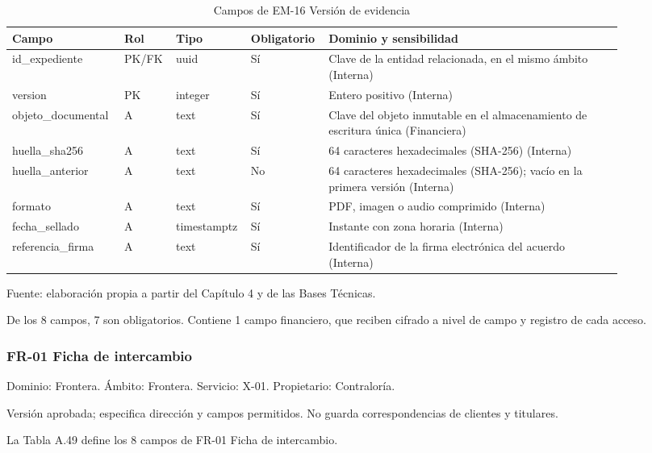 \documentclass[11pt]{article}
\begin{document}
\begin{table}[htbp]
\caption{Campos de EM-16 Versión de evidencia}\label{tab:d_em16}
\centering
\begin{tabular}{@{}p{0.167\linewidth}p{0.070\linewidth}p{0.079\linewidth}p{0.097\linewidth}p{0.465\linewidth}@{}}
\toprule Campo & Rol & Tipo & Obligatorio & Dominio y sensibilidad \\
\midrule
id\_expediente & PK/FK & uuid & Sí & Clave de la entidad relacionada, en el mismo ámbito (Interna) \\
version & PK & integer & Sí & Entero positivo (Interna) \\
objeto\_documental & A & text & Sí & Clave del objeto inmutable en el almacenamiento de escritura única (Financiera) \\
huella\_sha256 & A & text & Sí & 64 caracteres hexadecimales (SHA-256) (Interna) \\
huella\_anterior & A & text & No & 64 caracteres hexadecimales (SHA-256); vacío en la primera versión (Interna) \\
formato & A & text & Sí & PDF, imagen o audio comprimido (Interna) \\
fecha\_sellado & A & timestamptz & Sí & Instante con zona horaria (Interna) \\
referencia\_firma & A & text & Sí & Identificador de la firma electrónica del acuerdo (Interna) \\
\bottomrule
\end{tabular}
\par\smallskip
{\raggedright Fuente: elaboración propia a partir del Capítulo 4 y de las Bases Técnicas.\par}
\end{table}


De los 8 campos, 7 son obligatorios. Contiene 1 campo financiero, que reciben cifrado a nivel de campo y registro de cada acceso.

\subsubsection{FR-01 Ficha de intercambio}

Dominio: Frontera. Ámbito: Frontera. Servicio: X-01. Propietario: Contraloría.

Versión aprobada; especifica dirección y campos permitidos. No guarda correspondencias de clientes y titulares.

La Tabla A.49 define los 8 campos de FR-01 Ficha de intercambio.
\end{document}
